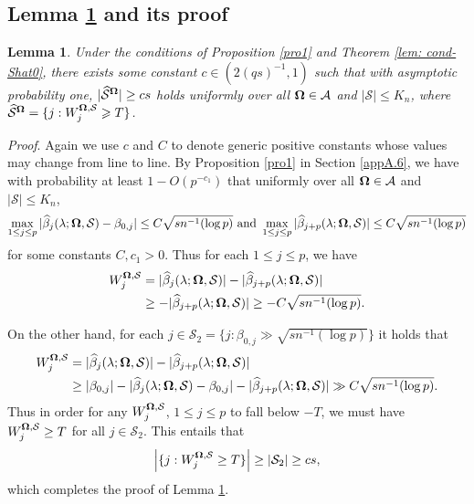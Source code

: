\documentclass[11pt]{article}
\newtheorem{lemma}{Lemma}%
\newcommand{\bOmg}{\mbox{\boldmath $\Omega$}}
\newcommand{\hbeta}{\widehat{\beta}}
\newcommand{\calA}{{\cal A}}
\newcommand{\sbOmg}{\mbox{\scriptsize\boldmath $\Omega$}}
\begin{document}
\subsection{Lemma \ref{lem: cond-Shat} and its proof} \label{appB.4}

\begin{lemma}\label{lem: cond-Shat}
Under the conditions of Proposition \ref{pro1} and Theorem \ref{lem: cond-Shat0}, there exists some constant $c \in (2(qs)^{-1},1)$ such that with asymptotic probability one, $|\widehat{\mathcal{S}}^{\sbOmg}| \geq cs$
holds uniformly over all $\bOmg \in \calA$ and $|\mathcal{S}|\leq K_n$, where $\widehat{\mathcal{S}}^{\sbOmg} = \{j:  W_j^{\sbOmg, \mathcal{S}}\geqslant T\}$.
\end{lemma}

\noindent \textit{Proof}. Again we use $c$ and $C$ to denote generic positive constants whose values may change from line to line.  By Proposition \ref{pro1} in Section \ref{appA.6}, we have with probability at least  $1-O(p^{-c_1})$ that uniformly over all $\bOmg\in \calA$ and $|\mathcal S| \leq K_n$,
	\begin{align*}
	\max_{1\leq j\leq p}|\hbeta_{j}(\lambda; {\bOmg}, \mathcal S) - \beta_{0,j}| \leq C\sqrt{sn^{-1}(\log p)} \text{ and } \max_{1 \leq j \leq  p}|\hbeta_{j+p}(\lambda; {\bOmg}, \mathcal S)|\leq C\sqrt{sn^{-1}(\log p)}
	\end{align*}
for some constants $C, c_1>0$. Thus for each $1 \leq j \leq p$, we have
\begin{align}\label{eq: e60prime}
\nonumber W_j^{\sbOmg, \mathcal S} & = |\hbeta_{j}(\lambda; {\bOmg}, \mathcal S) | - |\hbeta_{j+p}(\lambda; {\bOmg}, \mathcal S)| \\
& \geq - |\hbeta_{j+p}(\lambda; {\bOmg}, \mathcal S)| \geq - C \sqrt{s n^{-1} (\log p)}.
	\end{align}

On the other hand, for each $j \in \mathcal{S}_{2} = \{j: \beta_{0,j}\gg \sqrt{sn^{-1}(\log p)}\}$ it holds that
	\begin{align}\label{eq: e060}
\nonumber W_j^{\sbOmg, \mathcal S} & = |\hbeta_{j}(\lambda; {\bOmg}, \mathcal S) | - |\hbeta_{j+p}(\lambda; {\bOmg}, \mathcal S)| \\
& \geq   |\beta_{0,j}| - |\hbeta_{j}(\lambda; {\bOmg}, \mathcal S) - \beta_{0,j}| - |\hbeta_{j+p}(\lambda; {\bOmg}, \mathcal S)| \gg C \sqrt{s n^{-1} (\log p)}.
	\end{align}
Thus in order for  any $W_j^{\sbOmg, \mathcal S}$, $1 \leq j \leq p$ to fall below $-T$, we must have $W_j^{\sbOmg, \mathcal S} \geq T$ for all $j\in \mathcal{S}_2$. This entails that
\begin{align} \label{eqn:TzerotoStwo}
\left|\{j: W_j^{\sbOmg, \mathcal S} \geq T\}\right| \geq |\mathcal{S}_2| \geq cs,
\end{align}
 which completes the proof of Lemma \ref{lem: cond-Shat}.
\end{document}
